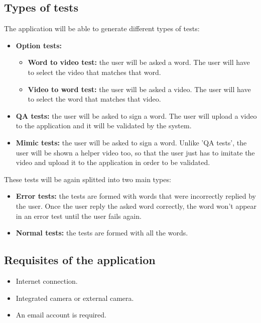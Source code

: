 \subsection{Types of tests}
The application will be able to generate different types of tests:
\begin{itemize}[noitemsep]
    \item \textbf{Option tests:}
        \begin{itemize}[noitemsep]
            \item \textbf{Word to video test:} the user will be asked a word. The user will have to select the video that matches that word.
            \item \textbf{Video to word test:} the user will be asked a video. The user will have to select the word that matches that video.
        \end{itemize}
    \item \textbf{QA tests:} the user will be asked to sign a word. The user will upload a video to the application and it will be validated by the system.
    \item \textbf{Mimic tests:} the user will be asked to sign a word. Unlike 'QA tests', the user will be shown a helper video too, so that the user just has to imitate the video and upload it to the application in order to be validated.
\end{itemize}

These tests will be again splitted into two main types:
\begin{itemize}[noitemsep]
    \item \textbf{Error tests:} the tests are formed with words that were incorrectly replied by the user. Once the user reply the asked word correctly, the word won't appear in an error test until the user fails again.
    \item \textbf{Normal tests:} the tests are formed with all the words.
\end{itemize}

\subsection{Requisites of the application}
\begin{itemize}[noitemsep]
    \item Internet connection.
    \item Integrated camera or external camera.
    \item An email account is required.
\end{itemize}


